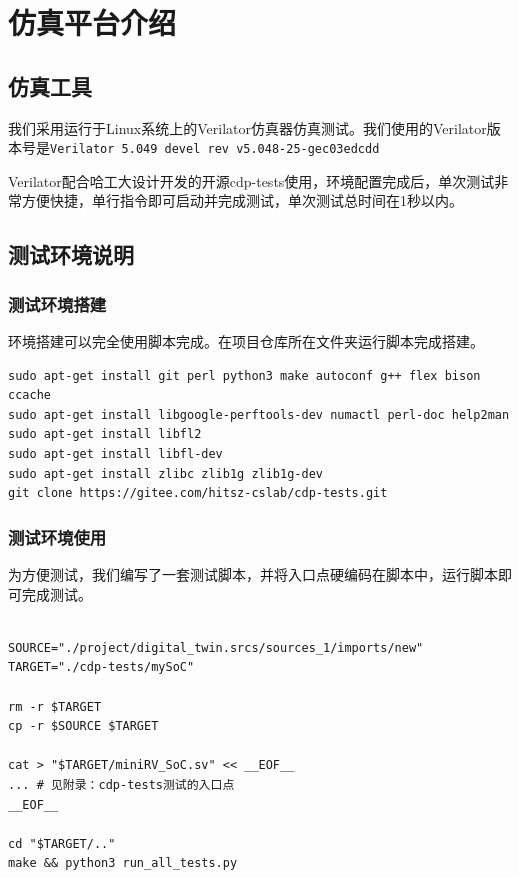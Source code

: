 \documentclass[12pt,a4paper]{ctexart}
\newcommand{\code}[1]{\texttt{#1}}
\begin{document}


\tableofcontents

\newpage

\section{仿真平台介绍}

\subsection{仿真工具}


我们采用运行于Linux系统上的Verilator仿真器仿真测试。我们使用的Verilator版本号是\code{Verilator 5.049 devel rev v5.048-25-gec03edcdd}

Verilator配合哈工大设计开发的开源cdp-tests使用，环境配置完成后，单次测试非常方便快捷，单行指令即可启动并完成测试，单次测试总时间在1秒以内。

\subsection{测试环境说明}

\subsubsection{测试环境搭建}

环境搭建可以完全使用脚本完成。在项目仓库所在文件夹运行脚本完成搭建。

\begin{lstlisting}[style=bashstyle]
sudo apt-get install git perl python3 make autoconf g++ flex bison ccache
sudo apt-get install libgoogle-perftools-dev numactl perl-doc help2man
sudo apt-get install libfl2
sudo apt-get install libfl-dev
sudo apt-get install zlibc zlib1g zlib1g-dev
git clone https://gitee.com/hitsz-cslab/cdp-tests.git
\end{lstlisting}

\subsubsection{测试环境使用}

为方便测试，我们编写了一套测试脚本，并将入口点硬编码在脚本中，运行脚本即可完成测试。

\begin{lstlisting}[style=bashstyle]

SOURCE="./project/digital_twin.srcs/sources_1/imports/new"
TARGET="./cdp-tests/mySoC"

rm -r $TARGET
cp -r $SOURCE $TARGET

cat > "$TARGET/miniRV_SoC.sv" << __EOF__
... # 见附录：cdp-tests测试的入口点
__EOF__

cd "$TARGET/.."
make && python3 run_all_tests.py

\end{lstlisting}
\end{document}
